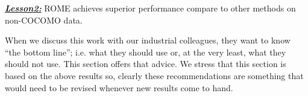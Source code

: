 \documentclass[sigconf,review]{acmart}
\newenvironment{result}[2]
{\begin{myshadowbox}\textbf{\textit{\underline{Lesson#1:}}} #2}{ 
\end{myshadowbox}}
\begin{document}
 \begin{result}{2}
ROME achieves superior performance compare to other methods on non-COCOMO data.
 \end{result}




 


 

 When we discuss this work with our industrial colleagues, they want to know ``the bottom line''; i.e. what they should use or, at the very least, what they should not use. This section offers that advice. We stress that this  section is  based on the above results so, clearly these   recommendations are something that would need to be revised whenever new results come to hand.
\end{document}
